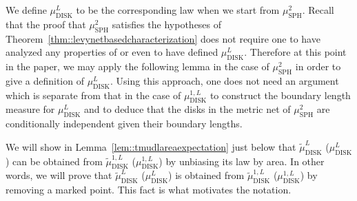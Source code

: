 \documentclass[10pt]{amsart}
\theoremstyle{plain}
\numberwithin{theorem}{section}
\theoremstyle{definition}
\newcommand{\mustwo}{\mu_{\mathrm{SPH}}^2}
\newcommand{\mudonel}{\mu_{ \mathrm{DISK}}^{1, L}}
\newcommand{\mudl}{\mu_{\mathrm{DISK}}^L}
\newcommand{\tmudonel}{\wt{\mu}_{ \mathrm{DISK}}^{1, L}}
\newcommand{\tmudl}{\wt{\mu}_{\mathrm{DISK}}^L}
\let\wt\widetilde
\begin{document}
We define $\mudl$ to be the corresponding law when we start from $\mustwo$. Recall that the proof that $\mustwo$ satisfies the hypotheses of Theorem~\ref{thm::levynetbasedcharacterization} does not require one to have analyzed any properties of or even to have defined $\mudl$. Therefore at this point in the paper, we may apply the following lemma in the case of $\mustwo$ in order to give a definition of $\mudl$. Using this approach, one does not need an argument which is separate from that in the case of $\mudonel$ to construct the boundary length measure for $\mudl$ and to deduce that the disks in the metric net of $\mustwo$ are conditionally independent given their boundary lengths.

We will show in Lemma~\ref{lem::tmudlareaexpectation} just below that $\tmudl$ (\resp $\mudl$) can be obtained from $\tmudonel$ (\resp $\mudonel$) by unbiasing its law by area. In other words, we will prove that $\tmudl$ (\resp $\mudl$) is obtained from $\tmudonel$ (\resp $\mudonel$) by removing a marked point. This fact is what motivates the notation.
\end{document}
